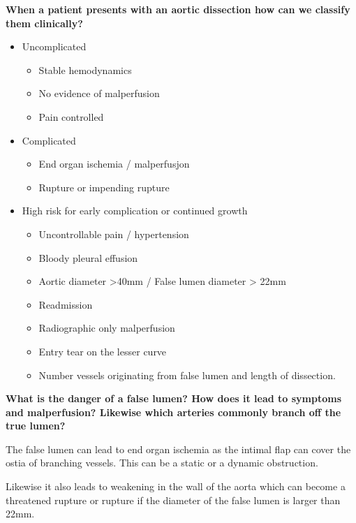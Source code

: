 \documentclass[
]{book}
\begin{document}
\textbf{When a patient presents with an aortic dissection how can we classify
them clinically?}

\begin{itemize}
\item
  Uncomplicated

  \begin{itemize}
  \item
    Stable hemodynamics
  \item
    No evidence of malperfusion
  \item
    Pain controlled
  \end{itemize}
\item
  Complicated

  \begin{itemize}
  \item
    End organ ischemia / malperfusjon
  \item
    Rupture or impending rupture
  \end{itemize}
\item
  High risk for early complication or continued
  growth\citep{vanbogerijen2014, reutersberg2018}

  \begin{itemize}
  \item
    Uncontrollable pain / hypertension
  \item
    Bloody pleural effusion
  \item
    Aortic diameter \textgreater40mm / False lumen diameter \textgreater{} 22mm
  \item
    Readmission
  \item
    Radiographic only malperfusion
  \item
    Entry tear on the lesser curve
  \item
    Number vessels originating from false lumen and length of
    dissection.\citep{brunkwall2014, kamman2017, nienaber2009}
  \end{itemize}
\end{itemize}

\textbf{What is the danger of a false lumen? How does it lead to symptoms and
malperfusion? Likewise which arteries commonly branch off the true
lumen?}

The false lumen can lead to end organ ischemia as the intimal flap can
cover the ostia of branching vessels. This can be a static or a dynamic
obstruction.

Likewise it also leads to weakening in the wall of the aorta which can
become a threatened rupture or rupture if the diameter of the false
lumen is larger than 22mm.
\end{document}
